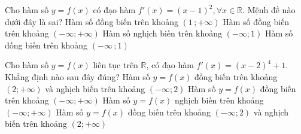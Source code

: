\begin{ex}%
	Cho hàm số $ y=f(x)$ có đạo hàm $f'(x)=\left(x-1\right)^2,\forall x\in \mathbb{R}$. Mệnh đề nào dưới đây là sai?
	\choice
	{Hàm số đồng biến trên khoảng $\left(1\,; +\infty\right)$}
	{Hàm số đồng biến trên khoảng $\left(-\infty; +\infty\right)$}
	{\True Hàm số nghịch biến trên khoảng $\left(-\infty; 1\right)$}
	{Hàm số đồng biến trên khoảng $\left(-\infty\,; 1\right)$}
\end{ex}

\begin{ex}%
	Cho hàm số $y=f(x)$ liên tục trên $\mathbb{R}$, có đạo hàm $f'(x)=\left(x-2\right)^4+1$. Khẳng định nào sau đây đúng?
	\choice
	{\True Hàm số $y=f(x)$ đồng biến trên khoảng $\left(2; +\infty\right)$ và nghịch biến trên khoảng $\left(-\infty; 2\right)$}
	{Hàm số $y=f(x)$ đồng biến trên khoảng $\left(-\infty; +\infty\right)$}
	{Hàm số $y=f(x)$ nghịch biến trên khoảng $\left(-\infty; +\infty\right)$}
	{Hàm số $y=f(x)$ đồng biến trên khoảng $\left(-\infty; 2\right)$ và nghịch biến trên khoảng $\left(2; +\infty\right)$}
\end{ex}

